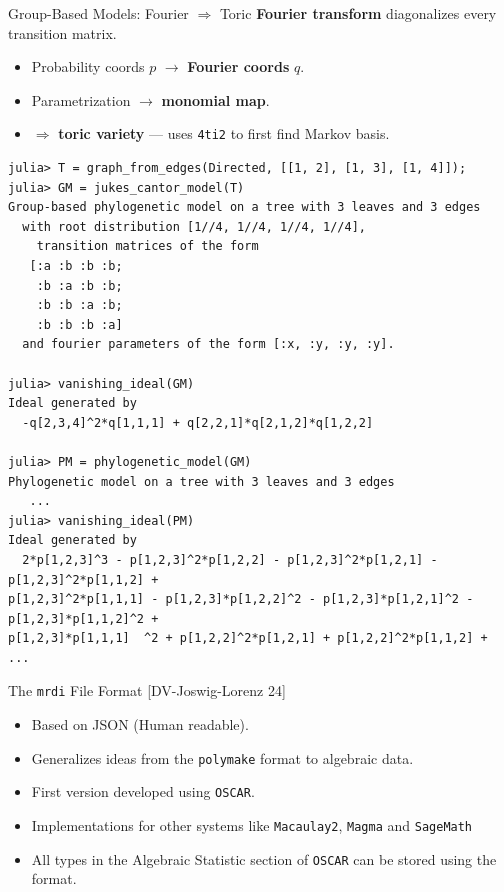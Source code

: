 \documentclass[9pt]{beamer}
\newcommand\OSCAR{\texttt{OSCAR}\xspace}
\newcommand\Macaulay{\texttt{Macaulay2}\xspace}
\newcommand{\mrdi}{\texttt{mrdi}\xspace}
\begin{document}
\begin{frame}[fragile]{Group-Based Models: Fourier $\Rightarrow$ Toric}
  \textbf{Fourier transform} diagonalizes every transition matrix.
  \bigskip

  \begin{itemize}
  \item Probability coords $p$ $\longrightarrow$ \textbf{Fourier coords} $q$.
  \item Parametrization $\to$ \textbf{monomial map}.
  \item $\Rightarrow$ \textbf{toric variety} --- uses \texttt{4ti2} to first find Markov basis.
  \end{itemize}
  \pause
  \medskip
\begin{verbatim}
julia> T = graph_from_edges(Directed, [[1, 2], [1, 3], [1, 4]]);
julia> GM = jukes_cantor_model(T)
Group-based phylogenetic model on a tree with 3 leaves and 3 edges 
  with root distribution [1//4, 1//4, 1//4, 1//4], 
    transition matrices of the form 
   [:a :b :b :b;
    :b :a :b :b;
    :b :b :a :b;
    :b :b :b :a]
  and fourier parameters of the form [:x, :y, :y, :y].

julia> vanishing_ideal(GM)
Ideal generated by
  -q[2,3,4]^2*q[1,1,1] + q[2,2,1]*q[2,1,2]*q[1,2,2]

julia> PM = phylogenetic_model(GM)
Phylogenetic model on a tree with 3 leaves and 3 edges 
   ...
julia> vanishing_ideal(PM)
Ideal generated by
  2*p[1,2,3]^3 - p[1,2,3]^2*p[1,2,2] - p[1,2,3]^2*p[1,2,1] - p[1,2,3]^2*p[1,1,2] +
p[1,2,3]^2*p[1,1,1] - p[1,2,3]*p[1,2,2]^2 - p[1,2,3]*p[1,2,1]^2 - p[1,2,3]*p[1,1,2]^2 +
p[1,2,3]*p[1,1,1]  ^2 + p[1,2,2]^2*p[1,2,1] + p[1,2,2]^2*p[1,1,2] + ...
\end{verbatim}
\end{frame}

\begin{frame}[fragile]{The \mrdi File Format [DV-Joswig-Lorenz 24]}
  \begin{tcolorbox}[]
    \begin{itemize}
    \item Based on JSON (Human readable).
    \item Generalizes ideas from the \texttt{polymake} format to algebraic data. 
    \item First version developed using \OSCAR. 
    \item Implementations for other systems like \Macaulay, \texttt{Magma} and \texttt{SageMath} 
    \item All types in the Algebraic Statistic section of \OSCAR can be stored using the format. 
    \end{itemize}
  \end{tcolorbox}
\end{frame}
\end{document}
